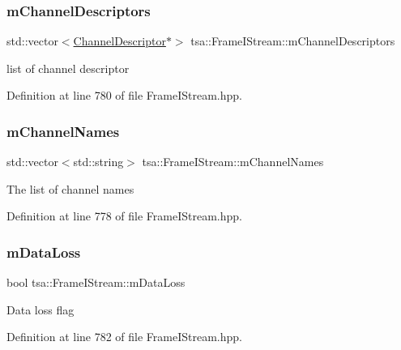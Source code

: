 \subsubsection{\texorpdfstring{m\+Channel\+Descriptors}{mChannelDescriptors}}
{\footnotesize\ttfamily std\+::vector$<$\hyperlink{classtsa_1_1_channel_descriptor}{Channel\+Descriptor}$\ast$$>$ tsa\+::\+Frame\+I\+Stream\+::m\+Channel\+Descriptors\hspace{0.3cm}{\ttfamily [private]}}

list of channel descriptor 

Definition at line 780 of file Frame\+I\+Stream.\+hpp.

\mbox{\label{classtsa_1_1_frame_i_stream_a14bff233330be1d0f995551d55b8eb98}} 
\subsubsection{\texorpdfstring{m\+Channel\+Names}{mChannelNames}}
{\footnotesize\ttfamily std\+::vector$<$std\+::string$>$ tsa\+::\+Frame\+I\+Stream\+::m\+Channel\+Names\hspace{0.3cm}{\ttfamily [private]}}

The list of channel names 

Definition at line 778 of file Frame\+I\+Stream.\+hpp.

\mbox{\label{classtsa_1_1_frame_i_stream_aef23fdf187cda4ab4a3aaaa0a9ba59ee}} 
\subsubsection{\texorpdfstring{m\+Data\+Loss}{mDataLoss}}
{\footnotesize\ttfamily bool tsa\+::\+Frame\+I\+Stream\+::m\+Data\+Loss\hspace{0.3cm}{\ttfamily [private]}}

Data loss flag 

Definition at line 782 of file Frame\+I\+Stream.\+hpp.

\mbox{\label{classtsa_1_1_frame_i_stream_a888a976c4806d295c7ab6731459a0d90}} 
